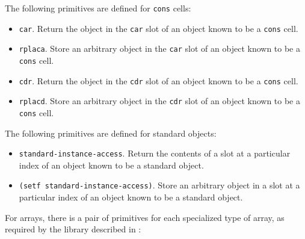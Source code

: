 The following primitives are defined for \texttt{cons} cells:

\begin{itemize}
\item \texttt{car}.  Return the object in the \texttt{car} slot of an
  object known to be a \texttt{cons} cell.
\item \texttt{rplaca}.  Store an arbitrary object in the \texttt{car}
  slot of an object known to be a \texttt{cons} cell.
\item \texttt{cdr}.  Return the object in the \texttt{cdr} slot of an
  object known to be a \texttt{cons} cell.
\item \texttt{rplacd}.  Store an arbitrary object in the \texttt{cdr}
  slot of an object known to be a \texttt{cons} cell.
\end{itemize}

The following primitives are defined for standard objects:

\begin{itemize}
\item \texttt{standard-instance-access}.  Return the contents of a
  slot at a particular index of an object known to be a standard
  object.
\item \texttt{(setf standard-instance-access)}.  Store an arbitrary
  object in a slot at a particular index of an object known to be a
  standard object.
\end{itemize}

For arrays, there is a pair of primitives for each specialized type of
array, as required by the \regalia{} library described in :

